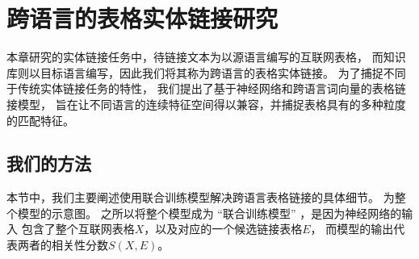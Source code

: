 

\chapter{跨语言的表格实体链接研究}
\label{chap:tabel}

本章研究的实体链接任务中，待链接文本为以源语言编写的互联网表格，
而知识库则以目标语言编写，因此我们将其称为跨语言的表格实体链接。
为了捕捉不同于传统实体链接任务的特性，
我们提出了基于神经网络和跨语言词向量的表格链接模型，
旨在让不同语言的连续特征空间得以兼容，并捕捉表格具有的多种粒度的匹配特征。









\section{我们的方法}
\label{sec:tabel-approach}

本节中，我们主要阐述使用联合训练模型解决跨语言表格链接的具体细节。
为整个模型的示意图。
之所以将整个模型成为 ``{联合训练模型}'' ，是因为神经网络的输入
包含了整个互联网表格$X$，以及对应的一个候选链接表格$E$，
而模型的输出代表两者的相关性分数$S(X, E)$。

